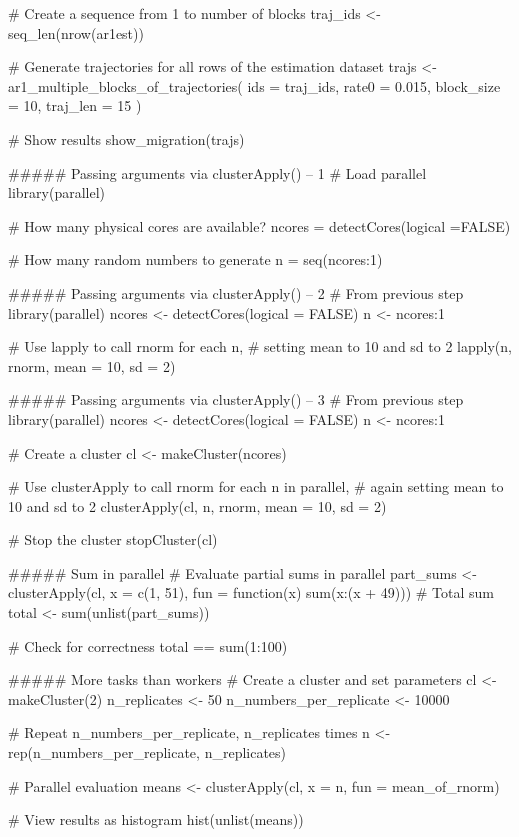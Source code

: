 # Create a sequence from 1 to number of blocks
traj_ids <- seq_len(nrow(ar1est))

# Generate trajectories for all rows of the estimation dataset
trajs <- ar1_multiple_blocks_of_trajectories(
  ids = traj_ids, rate0 = 0.015,
  block_size = 10, traj_len = 15
)

# Show results
show_migration(trajs)


##### Passing arguments via clusterApply()  -- 1
# Load parallel
library(parallel)

# How many physical cores are available?
ncores = detectCores(logical =FALSE)

# How many random numbers to generate
n = seq(ncores:1)



##### Passing arguments via clusterApply()  -- 2
# From previous step
library(parallel)
ncores <- detectCores(logical = FALSE)
n <- ncores:1

# Use lapply to call rnorm for each n,
# setting mean to 10 and sd to 2 
lapply(n, rnorm, mean = 10, sd = 2)



##### Passing arguments via clusterApply()  -- 3
# From previous step
library(parallel)
ncores <- detectCores(logical = FALSE)
n <- ncores:1

# Create a cluster
cl <- makeCluster(ncores)

# Use clusterApply to call rnorm for each n in parallel,
# again setting mean to 10 and sd to 2 
clusterApply(cl, n, rnorm, mean = 10, sd = 2)

# Stop the cluster
stopCluster(cl)


#####  Sum in parallel
# Evaluate partial sums in parallel
part_sums <- clusterApply(cl, x = c(1, 51),
                    fun = function(x) sum(x:(x + 49)))
# Total sum
total <- sum(unlist(part_sums))

# Check for correctness
total == sum(1:100)


##### More tasks than workers
# Create a cluster and set parameters
cl <- makeCluster(2)
n_replicates <- 50
n_numbers_per_replicate <- 10000

# Repeat n_numbers_per_replicate, n_replicates times
n <- rep(n_numbers_per_replicate, n_replicates)

# Parallel evaluation
means <- clusterApply(cl, x = n, fun = mean_of_rnorm)
                
# View results as histogram
hist(unlist(means))

